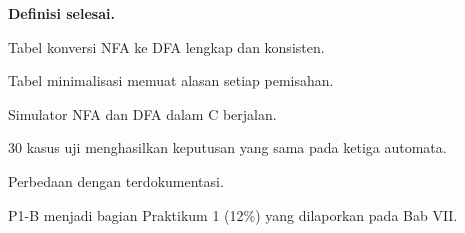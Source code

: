 \textbf{Definisi selesai.}
\begin{checklist}
  \item Tabel konversi NFA ke DFA lengkap dan konsisten.
  \item Tabel minimalisasi memuat alasan setiap pemisahan.
  \item Simulator NFA dan DFA dalam C berjalan.
  \item 30 kasus uji menghasilkan keputusan yang sama pada ketiga
        automata.
  \item Perbedaan dengan  terdokumentasi.
\end{checklist}

P1-B menjadi bagian Praktikum 1 (12\%) yang dilaporkan pada Bab VII.
